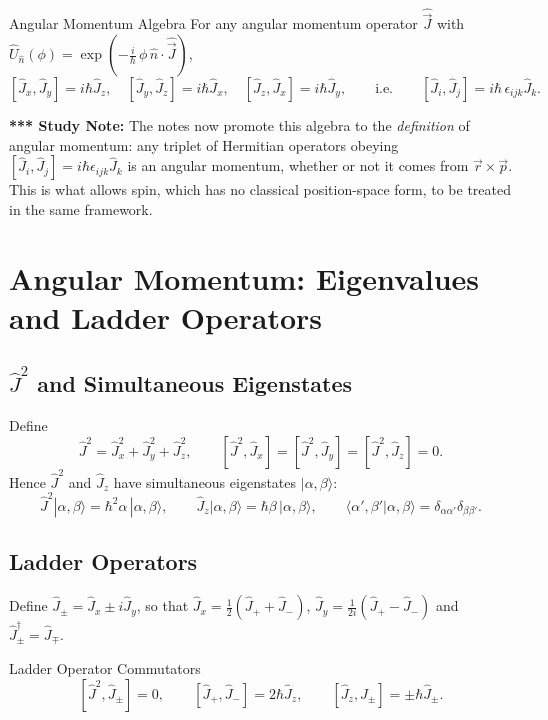 \documentclass[11pt,a4paper]{article}
\begin{document}
\begin{thm}{Angular Momentum Algebra}
For any angular momentum operator $\hat{\vec J}$ with $\hat U_{\hat n}(\phi)=\exp(-\tfrac i\hbar\,\phi\,\hat n\cdot\hat{\vec J})$,
\[
[\hat J_x,\hat J_y]=i\hbar\hat J_z,\quad [\hat J_y,\hat J_z]=i\hbar\hat J_x,\quad [\hat J_z,\hat J_x]=i\hbar\hat J_y,
\qquad\text{i.e.}\qquad [\hat J_i,\hat J_j]=i\hbar\,\epsilon_{ijk}\hat J_k .
\]
\end{thm}

\textbf{*** Study Note:} The notes now promote this algebra to the \emph{definition} of angular momentum: any triplet of Hermitian operators obeying $[\hat J_i,\hat J_j]=i\hbar\epsilon_{ijk}\hat J_k$ is an angular momentum, whether or not it comes from $\vec r\times\vec p$. This is what allows spin, which has no classical position-space form, to be treated in the same framework.

\section{Angular Momentum: Eigenvalues and Ladder Operators}
\label{sy:sec:ladder}

\subsection{\texorpdfstring{$\hat J^2$}{J-squared} and Simultaneous Eigenstates}
Define
\[
\hat J^2=\hat J_x^2+\hat J_y^2+\hat J_z^2,\qquad [\hat J^2,\hat J_x]=[\hat J^2,\hat J_y]=[\hat J^2,\hat J_z]=0 .
\]
Hence $\hat J^2$ and $\hat J_z$ have simultaneous eigenstates $|\alpha,\beta\rangle$:
\[
\hat J^2|\alpha,\beta\rangle=\hbar^2\alpha\,|\alpha,\beta\rangle,\qquad \hat J_z|\alpha,\beta\rangle=\hbar\beta\,|\alpha,\beta\rangle,\qquad \langle\alpha',\beta'|\alpha,\beta\rangle=\delta_{\alpha\alpha'}\delta_{\beta\beta'} .
\]

\subsection{Ladder Operators}
Define $\hat J_\pm=\hat J_x\pm i\hat J_y$, so that $\hat J_x=\tfrac12(\hat J_++\hat J_-)$, $\hat J_y=\tfrac1{2i}(\hat J_+-\hat J_-)$ and $\hat J_\pm^\dagger=\hat J_\mp$.

\begin{thm}{Ladder Operator Commutators}
\[
[\hat J^2,\hat J_\pm]=0,\qquad [\hat J_+,\hat J_-]=2\hbar\hat J_z,\qquad [\hat J_z,\hat J_\pm]=\pm\hbar\hat J_\pm .
\]
\end{thm}
\end{document}
